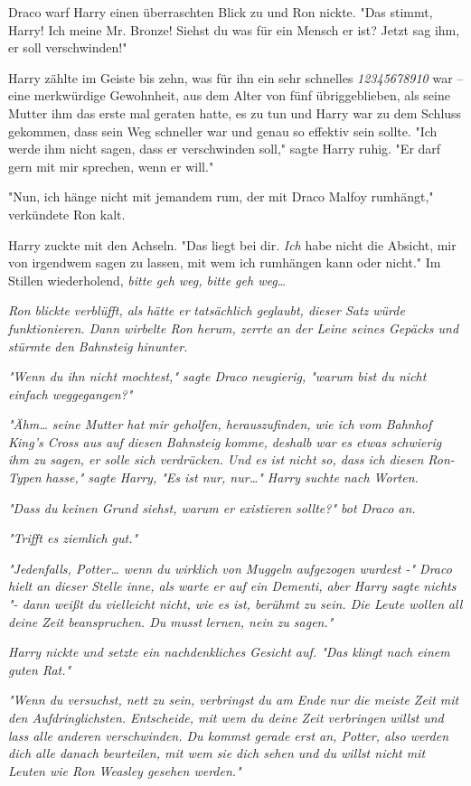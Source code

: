 {Draco warf Harry einen überraschten Blick zu und Ron nickte. "Das stimmt, Harry! Ich meine Mr. Bronze! Siehst du was für ein Mensch er ist? Jetzt sag ihm, er soll verschwinden!"

Harry zählte im Geiste bis zehn, was für ihn ein sehr schnelles \emph{12345678910} war -- eine merkwürdige Gewohnheit, aus dem Alter von fünf übriggeblieben, als seine Mutter ihm das erste mal geraten hatte, es zu tun und Harry war zu dem Schluss gekommen, dass sein Weg schneller war und genau so effektiv sein sollte. "Ich werde ihm nicht sagen, dass er verschwinden soll," sagte Harry ruhig. "Er darf gern mit mir sprechen, wenn er will."

"Nun, ich hänge nicht mit jemandem rum, der mit Draco Malfoy rumhängt," verkündete Ron kalt.

Harry zuckte mit den Achseln. "Das liegt bei dir. \emph{Ich} habe nicht die Absicht, mir von irgendwem sagen zu lassen, mit wem ich rumhängen kann oder nicht." Im Stillen wiederholend, \emph{bitte geh weg, bitte geh weg…}

\emph{Ron blickte verblüfft, als hätte er} \emph{tatsächlich geglaubt, dieser Satz würde funktionieren. Dann wirbelte Ron herum, zerrte an der Leine seines Gepäcks und stürmte den Bahnsteig hinunter.}

\emph{"Wenn du ihn nicht mochtest," sagte Draco neugierig, "warum bist du nicht einfach weggegangen?"}

\emph{"Ähm… seine Mutter hat mir geholfen, herauszufinden, wie ich vom Bahnhof King's Cross aus auf diesen Bahnsteig komme, deshalb war es etwas schwierig ihm zu sagen, er solle sich verdrücken. Und es ist nicht so, dass ich diesen Ron-Typen} \emph{\emph{hasse}," sagte Harry, "Es ist nur, nur…" Harry suchte nach Worten.}

\emph{"Dass du keinen Grund siehst, warum er existieren sollte?" bot Draco an.}

\emph{"Trifft es ziemlich gut."}

\emph{"Jedenfalls, Potter… wenn du wirklich von Muggeln aufgezogen wurdest -" Draco hielt an dieser Stelle inne, als warte er auf ein Dementi, aber Harry sagte nichts "- dann weißt du vielleicht nicht, wie es ist, berühmt zu sein. Die Leute wollen} \emph{\emph{all}} \emph{deine Zeit beanspruchen. Du} \emph{\emph{musst}} \emph{lernen, nein zu sagen."}

\emph{Harry nickte und setzte ein nachdenkliches Gesicht auf. "Das klingt nach einem guten Rat."}

\emph{"Wenn du versuchst, nett zu sein, verbringst du am Ende nur die meiste Zeit mit den Aufdringlichsten. Entscheide, mit wem du deine Zeit verbringen} \emph{\emph{willst}} \emph{und lass alle anderen verschwinden. Du kommst gerade erst an, Potter, also werden dich alle danach beurteilen, mit wem sie dich sehen und du willst nicht mit Leuten wie Ron Weasley gesehen werden."}

}

